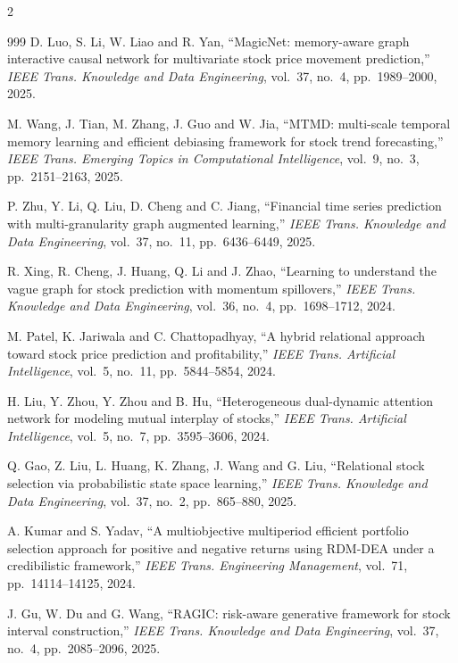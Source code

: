 \begin{footnotesize}
\begin{multicols}{2}
\begin{thebibliography}{999}
 D. Luo, S. Li, W. Liao and R. Yan, ``MagicNet: memory-aware graph
interactive causal network for multivariate stock price movement prediction,'' \emph{IEEE
Trans. Knowledge and Data Engineering}, vol.~37, no.~4, pp.~1989--2000, 2025.

 M. Wang, J. Tian, M. Zhang, J. Guo and W. Jia, ``MTMD: multi-scale
temporal memory learning and efficient debiasing framework for stock trend forecasting,''
\emph{IEEE Trans. Emerging Topics in Computational Intelligence}, vol.~9, no.~3,
pp.~2151--2163, 2025.

 P. Zhu, Y. Li, Q. Liu, D. Cheng and C. Jiang, ``Financial time
series prediction with multi-granularity graph augmented learning,'' \emph{IEEE Trans.
Knowledge and Data Engineering}, vol.~37, no.~11, pp.~6436--6449, 2025.

 R. Xing, R. Cheng, J. Huang, Q. Li and J. Zhao, ``Learning to
understand the vague graph for stock prediction with momentum spillovers,'' \emph{IEEE Trans.
Knowledge and Data Engineering}, vol.~36, no.~4, pp.~1698--1712, 2024.

 M. Patel, K. Jariwala and C. Chattopadhyay, ``A hybrid relational
approach toward stock price prediction and profitability,'' \emph{IEEE Trans. Artificial
Intelligence}, vol.~5, no.~11, pp.~5844--5854, 2024.

 H. Liu, Y. Zhou, Y. Zhou and B. Hu, ``Heterogeneous
dual-dynamic attention network for modeling mutual interplay of stocks,'' \emph{IEEE Trans.
Artificial Intelligence}, vol.~5, no.~7, pp.~3595--3606, 2024.

 Q. Gao, Z. Liu, L. Huang, K. Zhang, J. Wang and G. Liu,
``Relational stock selection via probabilistic state space learning,'' \emph{IEEE Trans.
Knowledge and Data Engineering}, vol.~37, no.~2, pp.~865--880, 2025.

 A. Kumar and S. Yadav, ``A multiobjective multiperiod efficient
portfolio selection approach for positive and negative returns using RDM-DEA under a
credibilistic framework,'' \emph{IEEE Trans. Engineering Management}, vol.~71,
pp.~14114--14125, 2024.

 J. Gu, W. Du and G. Wang, ``RAGIC: risk-aware generative framework for
stock interval construction,'' \emph{IEEE Trans. Knowledge and Data Engineering}, vol.~37,
no.~4, pp.~2085--2096, 2025.


\end{thebibliography}
\end{multicols}
\end{footnotesize}
